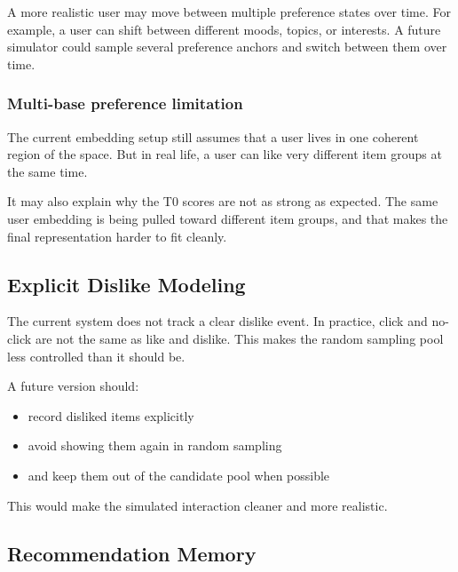 A more realistic user may move between multiple preference states over time. 
For example, a user can shift between different moods, topics, or interests. 
A future simulator could sample several preference anchors and switch between them over time.

\subsubsection{Multi-base preference limitation}

The current embedding setup still assumes that a user lives in one coherent region of the space. 
But in real life, a user can like very different item groups at the same time.

It may also explain why the T0 scores are not as strong as expected. 
The same user embedding is being pulled toward different item groups, 
and that makes the final representation harder to fit cleanly.



\subsection{Explicit Dislike Modeling}

The current system does not track a clear dislike event. 
In practice, click and no-click are not the same as like and dislike. 
This makes the random sampling pool less controlled than it should be.

A future version should:

\begin{itemize}
    \item record disliked items explicitly
    \item avoid showing them again in random sampling
    \item and keep them out of the candidate pool when possible
\end{itemize}

This would make the simulated interaction cleaner and more realistic.




\subsection{Recommendation Memory}

